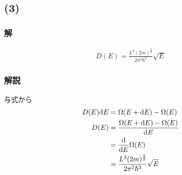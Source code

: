 \subsection*{(3)}
\subsubsection*{解}
\begin{align*}
  D(E)=\frac{L^3(2m)^{\frac{3}{2}}}{2\pi^2\hbar^3}\sqrt{E}
\end{align*}
\hrulefill
\subsubsection*{解説}
与式から
\begin{align}
  D(E){\rm d}E&=\Omega(E+{\rm d}E)-\Omega(E)\\
  D(E)&=\frac{\Omega(E+{\rm d}E)-\Omega(E)}{{\rm d}E}\\
  &=\frac{{\rm d}}{{\rm d} E}\Omega(E)\\
  &=\frac{L^3(2m)^{\frac{3}{2}}}{2\pi^2\hbar^3}\sqrt{E}
\end{align}
